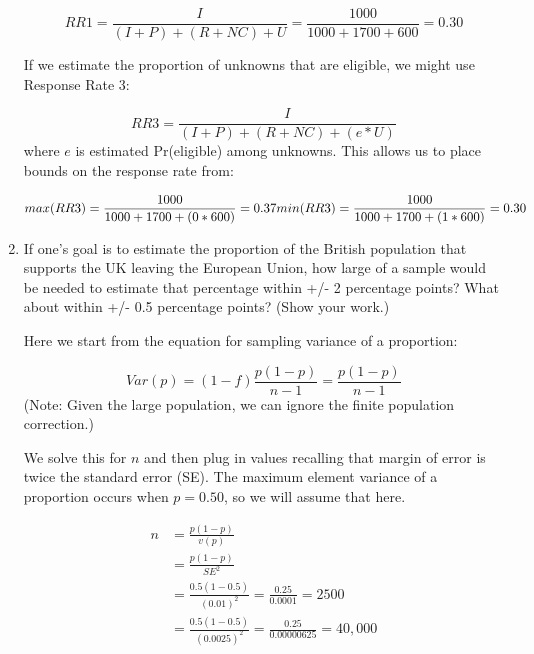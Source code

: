 \documentclass[a4paper]{exam}
\begin{document}
\begin{enumerate}
\begin{solution}
\begin{equation}
RR1 = \dfrac{I}{(I + P) + (R + NC) + U} = \dfrac{1000}{1000 + 1700 + 600} = 0.30
\end{equation}

If we estimate the proportion of unknowns that are eligible, we might use Response Rate 3:

\begin{equation}
RR3 = \frac{I}{(I + P) + (R + NC) + (e*U)}
\end{equation}
where $e$ is estimated Pr(eligible) among unknowns. This allows us to place bounds on the response rate from:

\begin{equation}
max(RR3) = \frac{1000}{1000 + 1700 + (0*600)} = 0.37\\
min(RR3) = \frac{1000}{1000 + 1700 + (1*600)} = 0.30
\end{equation}

\end{solution}


\item If one's goal is to estimate the proportion of the British population that supports the UK leaving the European Union, how large of a sample would be needed to estimate that percentage within +/- 2 percentage points? What about within +/- 0.5 percentage points? (Show your work.)

\begin{solution}

Here we start from the equation for sampling variance of a proportion:

\begin{equation}
Var(p) = (1-f)\frac{p(1-p)}{n-1} = \frac{p(1-p)}{n-1}
\end{equation}
(Note: Given the large population, we can ignore the finite population correction.)

We solve this for $n$ and then plug in values recalling that margin of error is twice the standard error (SE). The maximum element variance of a proportion occurs when $p = 0.50$, so we will assume that here.

\begin{align}
n & = \frac{p(1-p)}{v(p)}\\
  & = \frac{p(1-p)}{SE^2}\\
  & = \frac{0.5(1-0.5)}{(0.01)^2} = \frac{0.25}{0.0001} = 2500\\
  & = \frac{0.5(1-0.5)}{(0.0025)^2} = \frac{0.25}{0.00000625} = 40,000\\
\end{align}


\end{solution}
\end{enumerate}
\end{document}

